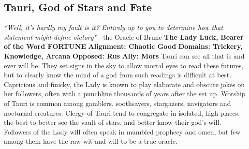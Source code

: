 \subsection{Tauri, God of Stars and Fate}\label{god:tauri}
\textit{“Well, it’s hardly my fault is it? Entirely up to you to determine how that statement might define victory"}
\break
\hspace*{\fill} - the Oracle of Brune
\break
\break
\textbf{The Lady Luck, Bearer of the Word FORTUNE}\break
\hspace*{\fill}\break
\textbf{Alignment:\hspace*{\fill} Chaotic Good} \break
\textbf{Domains:\hspace*{\fill} Trickery, Knowledge, Arcana} \break
\textbf{Opposed:\hspace*{\fill} Rus} \break
\textbf{Ally:\hspace*{\fill} Mors} \break
\hspace*{\fill}\break
Tauri can see all that is and ever will be. They set signs in the sky to allow mortal eyes to read these futures, but to clearly know the mind of a god from such readings is difficult at best. Capricious and finicky, the Lady is known to play elaborate and obscure jokes on her followers, often with a punchline thousands of years after the set up.\newline
Worship of Tauri is common among gamblers, soothsayers, stargazers, navigators and nocturnal creatures.\newline
Clergy of Tauri tend to congregate in isolated, high places, the best to better see the vault of stars, and better know their god’s will. Followers of the Lady will often speak in mumbled prophecy and omen, but few among them have the raw wit and will to be a true oracle.  

